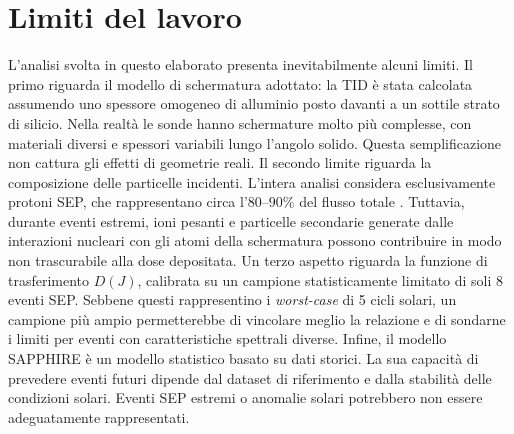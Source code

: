 \documentclass[12pt]{report}
\begin{document}
\section{Limiti del lavoro}
\vspace{-10pt}
L'analisi svolta in questo elaborato presenta inevitabilmente alcuni limiti. Il primo riguarda il modello di schermatura adottato: la TID è stata calcolata assumendo uno spessore omogeneo di alluminio posto davanti a un sottile strato di silicio. Nella realtà le sonde hanno schermature molto più complesse, con materiali diversi e spessori variabili lungo l'angolo solido. Questa semplificazione non cattura gli effetti di geometrie reali. Il secondo limite riguarda la composizione delle particelle incidenti. L'intera analisi considera esclusivamente protoni SEP, che rappresentano circa l'$80$--$90\%$ del flusso totale \cite{Reames1999}. Tuttavia, durante eventi estremi, ioni pesanti e particelle secondarie generate dalle interazioni nucleari con gli atomi della schermatura possono contribuire in modo non trascurabile alla dose depositata. Un terzo aspetto riguarda la funzione di trasferimento $D(J)$, calibrata su un campione statisticamente limitato di soli 8 eventi SEP. Sebbene questi rappresentino i \textit{worst-case} di 5 cicli solari, un campione più ampio permetterebbe di vincolare meglio la relazione e di sondarne i limiti per eventi con caratteristiche spettrali diverse. Infine, il modello SAPPHIRE è un modello statistico basato su dati storici. La sua capacità di prevedere eventi futuri dipende dal dataset di riferimento e dalla stabilità delle condizioni solari. Eventi SEP estremi o anomalie solari potrebbero non essere adeguatamente rappresentati.
\end{document}
